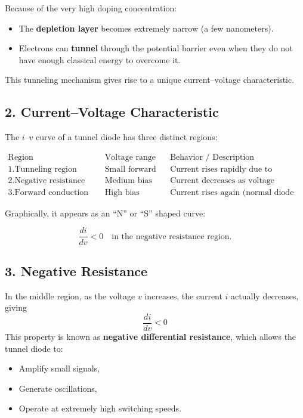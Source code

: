 \documentclass{article}
\begin{document}
Because of the very high doping concentration:
\begin{itemize}
    \item The \textbf{depletion layer} becomes extremely narrow (a few nanometers).
    \item Electrons can \textbf{tunnel} through the potential barrier even when they do not have enough classical energy to overcome it.
\end{itemize}

This tunneling mechanism gives rise to a unique current--voltage characteristic.

\subsection*{2. Current--Voltage Characteristic}

The \( i\text{--}v \) curve of a tunnel diode has three distinct regions:

\[
\begin{array}{c|c|l}
\text{Region} & \text{Voltage range} & \text{Behavior / Description} \\ \hline
1. \text{Tunneling region} & \text{Small forward bias} & \text{Current rises rapidly due to tunneling.} \\
2. \text{Negative resistance region} & \text{Medium bias} & \text{Current decreases as voltage increases.} \\
3. \text{Forward conduction region} & \text{High bias} & \text{Current rises again (normal diode behavior).}
\end{array}
\]

Graphically, it appears as an ``N'' or ``S'' shaped curve:

\[
\frac{di}{dv} < 0 \quad \text{in the negative resistance region.}
\]

\subsection*{3. Negative Resistance}

In the middle region, as the voltage \( v \) increases, the current \( i \) actually decreases, giving
\[
\frac{di}{dv} < 0
\]
This property is known as \textbf{negative differential resistance}, which allows the tunnel diode to:
\begin{itemize}
    \item Amplify small signals,
    \item Generate oscillations,
    \item Operate at extremely high switching speeds.
\end{itemize}
\end{document}
